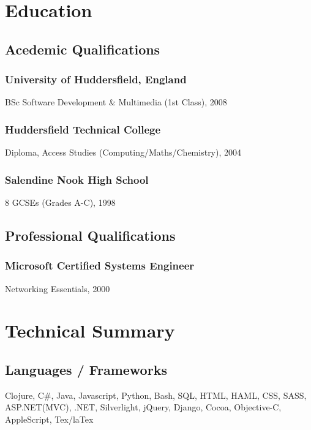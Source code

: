 \documentclass{article}
\title{}
\author{Andrew Mcveigh}
\date{}
\begin{document}
\section*{Education}
\label{sec-1}

\subsection*{Acedemic Qualifications}
\label{sec-1.1}

\subsubsection*{University of Huddersfield, England}
\label{sec-1.1.1}

BSc Software Development \& Multimedia (1st Class), 2008
\subsubsection*{Huddersfield Technical College}
\label{sec-1.1.2}

Diploma, Access Studies (Computing/Maths/Chemistry), 2004
\subsubsection*{Salendine Nook High School}
\label{sec-1.1.3}

8 GCSEs (Grades A-C), 1998
\subsection*{Professional Qualifications}
\label{sec-1.2}

\subsubsection*{Microsoft Certified Systems Engineer}
\label{sec-1.2.1}

    Networking Essentials, 2000
\section*{Technical Summary}
\label{sec-2}

\subsection*{Languages / Frameworks}
\label{sec-2.1}

Clojure, C\#, Java, Javascript, Python, Bash, SQL, HTML, HAML, CSS, SASS, ASP.NET(MVC), .NET, Silverlight, jQuery, Django, Cocoa, Objective-C, AppleScript, Tex/laTex
\end{document}
